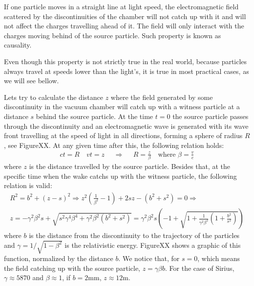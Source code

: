 \documentclass[
	12pt,				%
	openright,			%
	oneside,			%
	a4paper,		%
	chapter=TITLE,		%
	section=TITLE,		%
    brazil,				%
	english,			%
	sumario=tradicional,
	]{abntex2}
\begin{document}
If one particle moves in a straight line at light speed, the electromagnetic field scattered by the discontinuities of the chamber will not catch up with it and will not affect the charges travelling ahead of it. The field will only interact with the charges moving behind of the source particle. Such property is known as causality.

Even though this property is not strictly true in the real world, because particles always travel at speeds lower than the light's, it is true in most practical cases, as we will see bellow.

Lets try to calculate the distance $z$ where the field generated by some discontinuity in the vacuum chamber will catch up with a witness particle at a distance $s$ behind the source particle. At the time $t=0$ the source particle passes through the discontinuity and an electromagnetic wave is generated with its wave front travelling at the speed of light in all directions, forming a sphere of radius $R$, see FigureXX. At any given time after this, the following relation holds:
\begin{align}
ct = R \quad vt = z && \Rightarrow && R = \frac{z}{\beta} \quad \text{where} \,\, \beta = \frac{v}{c}
\end{align}
where $z$ is the distance travelled by the source particle. Besides that, at the specific time when the wake catchs up with the witness particle, the following relation is valid:
\begin{align}
R^2 = b^2 + (z-s)^2  \Rightarrow z^2(\frac{1}{\beta^2}-1) + 2sz - (b^2 + s^2) = 0  \Rightarrow \\
z = -\gamma^2 \beta^2 s + \sqrt{s^2\gamma^4\beta^4 + \gamma^2\beta^2\left(b^2 + s^2\right)}  = \gamma^2 \beta^2 s\left(-1 + \sqrt{1 + \frac{1}{\gamma^2\beta^2}\left(1 + \frac{b^2}{s^2}\right)}\right)
\end{align}
where $b$ is the distance from the discontinuity to the trajectory of the particles and $\gamma = 1/\sqrt{1-\beta^2}$ is the relativistic energy. FigureXX shows a graphic of this function, normalized by the distance $b$. We notice that, for $s=0$, which means the field catching up with the source particle, $z = \gamma\beta b$. For the case of Sirius, $\gamma \approx 5870$ and $\beta \approx 1$, if $ b = 2$mm, $z \approx 12$m.
\end{document}
